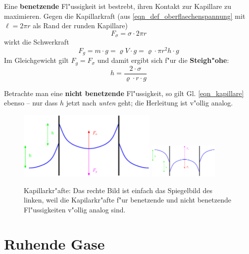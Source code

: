 Eine \textbf{benetzende} Fl"ussigkeit ist bestrebt, ihren Kontakt zur
Kapillare zu maximieren. Gegen die Kapillarkraft (aus
\eqref{eqn_def_oberflaechenspannung} mit $\ell = 2\pi r$ als Rand der
runden Kapillare)
\begin{equation}
   \label{eq:99}
F_\sigma = \sigma \cdot 2 \pi r   
\end{equation}
wirkt die Schwerkraft
\begin{equation}
   \label{eq:100}
   F_g = m \cdot g = \varrho V \cdot g = \varrho \cdot \pi r^2 h \cdot g
\end{equation}
 Im Gleichgewicht gilt $F_g = F_\sigma$ und damit ergibt sich f"ur die \textbf{Steigh"ohe}:
 \begin{equation}
    \label{eqn_kapillare}
\boxed{    h = \frac{2 \cdot \sigma}{\varrho \cdot r \cdot g} }
 \end{equation}

Betrachte man eine \textbf{nicht benetzende} Fl"ussigkeit, so gilt
Gl. \eqref{eqn_kapillare} ebenso -- nur dass $h$ jetzt nach
\emph{unten} geht; die Herleitung ist v"ollig analog.


\begin{figure}
   \centering
   \includegraphics[width=0.6\textwidth]{bilder/kapillarA}
   \hfill
   \includegraphics[width=0.3\textwidth]{bilder/kapillarB}
   \caption[Kapillarkräfte]{Kapillarkr"afte: Das rechte Bild ist
     einfach das Spiegelbild des linken, weil die Kapilarkr"afte f"ur
     benetzende und nicht benetzende Fl"ussigkeiten v"ollig analog
     sind.}
   \label{abb_kapillar}
\end{figure}







\section{Ruhende Gase}
\label{kap_ruhende-gase}

